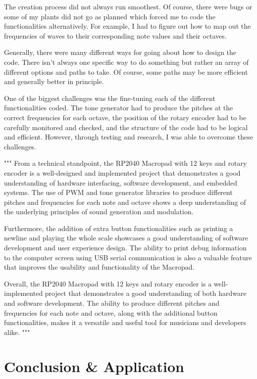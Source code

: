 \documentclass{article}
\begin{document}
The creation process did not always run smoothest. Of course, there were bugs or some of my plants did not go as planned which forced me to code the functionalities alternatively. For example, I had to figure out how to map out the frequencies of waves to their corresponding note values and their octaves.

Generally, there were many different ways for going about how to design the code. There isn't always one specific way to do something but rather an array of different options and paths to take. Of course, some paths may be more efficient and generally better in principle. 

One of the biggest challenges was the fine-tuning each of the different functionalities coded. The tone generator had to produce the pitches at the correct frequencies for each octave, the position of the rotary encoder had to be carefully monitored and checked, and the structure of the code had to be logical and efficient. However, through testing and research, I was able to overcome these challenges. 

"""
From a technical standpoint, the RP2040 Macropad with 12 keys and rotary encoder is a well-designed and implemented project that demonstrates a good understanding of hardware interfacing, software development, and embedded systems. The use of PWM and tone generator libraries to produce different pitches and frequencies for each note and octave shows a deep understanding of the underlying principles of sound generation and modulation.

Furthermore, the addition of extra button functionalities such as printing a newline and playing the whole scale showcases a good understanding of software development and user experience design. The ability to print debug information to the computer screen using USB serial communication is also a valuable feature that improves the usability and functionality of the Macropad.

Overall, the RP2040 Macropad with 12 keys and rotary encoder is a well-implemented project that demonstrates a good understanding of both hardware and software development. The ability to produce different pitches and frequencies for each note and octave, along with the additional button functionalities, makes it a versatile and useful tool for musicians and developers alike.
"""


\section{Conclusion \& Application}
\end{document}
